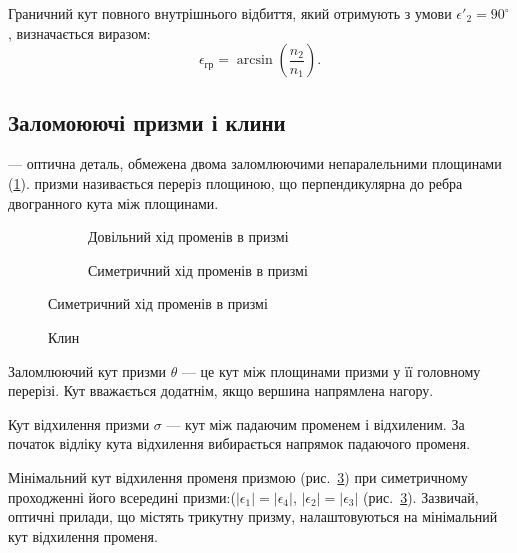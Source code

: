 Граничний кут
повного внутрішнього відбиття, який отримують з умови $\epsilon'_2 = 90^\circ$,
визначається виразом:
\begin{equation}\label{eq:total reflection}
	\epsilon_\text{гр} = \arcsin\left(\frac{n_2}{n_1}\right).
\end{equation}

\subsection*{Заломоюючі призми і клини}


 --- оптична деталь, обмежена двома заломлюючими непаралельними
площинами (\ref{pic:prism}).  призми називається переріз площиною, що перпендикулярна до ребра двогранного кута між площинами.

\begin{figure}[h!]\centering
    \begin{subfigure}{.47\linewidth}\centering
        
        \caption{Довільний хід променів в призмі}
        \label{pic:prism}
    \end{subfigure}
    \quad
    \begin{subfigure}{.47\linewidth}\centering
        
        \caption{Симетричний хід променів в призмі}
        \label{pic:prism_min}
    \end{subfigure}
\end{figure}



\begin{wrapfigure}{O}{0.33\linewidth}\centering
    
    \caption{Клин}
    \label{pic:klin}
\end{wrapfigure}
Заломлюючий кут призми $\theta$ --- це кут між площинами призми у її головному перерізі. Кут вважається додатнім, якщо вершина напрямлена нагору.

Кут відхилення призми  $\sigma$ --- кут між падаючим променем і відхиленим. За початок відліку кута відхилення вибирається напрямок падаючого променя.


Мінімальний кут відхилення променя призмою (рис.~\ref{pic:prism_min}) при
симетричному проходженні його всередині призми:($|\epsilon_1| = |\epsilon_4|$, $|\epsilon_2| = |\epsilon_3|$ (рис.~\ref{pic:prism_min}). Зазвичай, оптичні прилади, що містять трикутну призму, налаштовуються на мінімальний кут відхилення променя.

